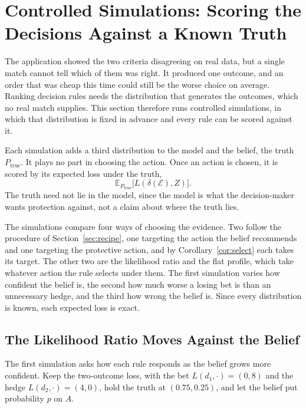 \section{Controlled Simulations: Scoring the Decisions Against a Known Truth}\label{sec:simulations}

The application showed the two criteria disagreeing on real data, but a
single match cannot tell which of them was right. It produced one outcome,
and an order that was cheap this time could still be the worse choice on
average. Ranking decision rules needs the distribution
that generates the outcomes, which no real match supplies. This section
therefore runs controlled simulations, in which that distribution is fixed in
advance and every rule can be scored against it.

Each simulation adds a third distribution to the model and the belief, the
truth $P_{\mathrm{true}}$. It plays no part in choosing the action. Once an
action is chosen, it is scored by its expected loss under the truth,
\[
  \mathbb E_{P_{\mathrm{true}}}\bigl[L(\delta(\mathcal E),Z)\bigr].
\]
The truth need not lie in the model, since the model is what the
decision-maker wants protection against, not a claim about where the truth
lies.

The simulations compare four ways of choosing the evidence. Two follow the
procedure of Section~\ref{sec:recipe}, one targeting the action the belief
recommends and one targeting the protective action, and by
Corollary~\ref{cor:select} each takes its target. The other two are the
likelihood ratio and the flat profile, which take whatever action the rule
selects under them. The first simulation varies how confident the belief is,
the second how much worse a losing bet is than an unnecessary hedge, and the
third how wrong the belief is. Since every distribution is known, each
expected loss is exact.

\subsection{The Likelihood Ratio Moves Against the Belief}\label{sec:sim_belief}

The first simulation asks how each rule responds as the belief grows more
confident. Keep the two-outcome loss, with the bet $L(d_1,\cdot)=(0,8)$ and
the hedge $L(d_2,\cdot)=(4,0)$, hold the truth at $(0.75,0.25)$, and let the
belief put probability $p$ on $A$.

